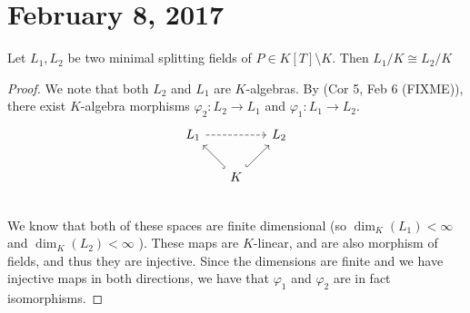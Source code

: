 \section{February 8, 2017}

\begin{prop}
    Let $L_1, L_2$ be two minimal splitting fields of $P \in K[T] \setminus K$.
    Then $L_1 / K \cong L_2 / K$
\end{prop}

\begin{proof}
    We note that both $L_2$ and $L_1$ are $K$-algebras. By (Cor 5, Feb 6 (FIXME)),
    there exist $K$-algebra morphisms $\varphi_2: L_2 \rightarrow L_1$ and $\varphi_1: L_1 \rightarrow
    L_2$.
    \[
\begin{tikzcd}[,every arrow/.append style={maps to}
,every label/.append style={font=\normalsize},column sep=1.5em]
L_1  \arrow[rr, dashrightarrow] && L_2 \\
 & \arrow[ul, hook] K \arrow[ur, hook] \\
\end{tikzcd}
\]
We know that both of these spaces are finite dimensional (so $\dim_K(L_1) < \infty$
and $\dim_K(L_2) < \infty$ ). These maps are $K$-linear, and are also morphism
of fields, and thus they are injective. Since the dimensions are finite and we
have injective maps in both directions, we have that $\varphi_1$ and $\varphi_2$ are
in fact isomorphisms.
\end{proof}

